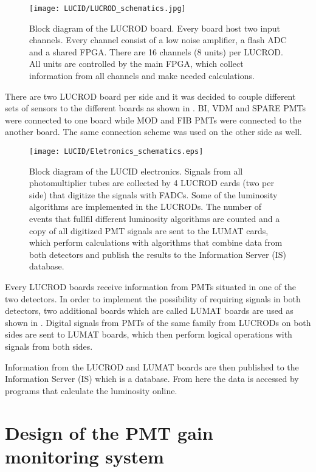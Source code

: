 \begin{figure}
\centering
\texttt{[image: LUCID/LUCROD\_schematics.jpg]}
\caption{Block diagram of the LUCROD board. Every board host two input channels. Every channel consist of a low noise amplifier, a flash ADC and a shared FPGA. 
There are 16 channels (8 units) per LUCROD. All units are controlled by the main FPGA, which collect information from all channels and make needed calculations.}
\label{fig:LUCROD_schematics}
\end{figure}

There are two LUCROD board per side and it was decided to couple different sets of sensors to the different boards as shown in 
.
BI, VDM and SPARE PMTs were connected to one board while MOD and FIB PMTs were connected to the another board.
The same connection scheme was used on the other side as well.

\begin{figure}
\centering
\texttt{[image: LUCID/Eletronics\_schematics.eps]}
\caption{Block diagram of the LUCID electronics. Signals from all photomultiplier tubes are collected by 4 \mbox{LUCROD} cards 
(two per side) that digitize the signals with FADCs. Some of the luminosity algorithms are implemented in the LUCRODs. 
The number of events that fullfil different luminosity algorithms are counted and a copy of all digitized PMT 
signals are sent to the LUMAT cards, which perform calculations with algorithms that combine data from 
both detectors and publish the results to the Information Server (IS) database.}
\label{fig:Eletronics_schematics}
\end{figure}

Every LUCROD boards receive information from PMTs situated in one of the two detectors.
In order to implement the possibility of requiring signals in both detectors, two additional boards which are called LUMAT boards are used
as shown in .
Digital signals from PMTs of the same family from LUCRODs on both sides are sent to LUMAT boards, 
which then perform logical operations with signals from both sides.

Information from the LUCROD and LUMAT boards are then published to the Information Server (IS) which is a database.
From here the data is accessed by programs that calculate the luminosity online.

\section{Design of the PMT gain monitoring system}
\label{sec:pmtGainMonitoringSystem}

